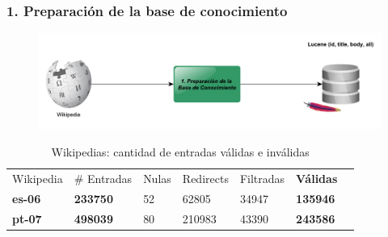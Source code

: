 \begin{frame}
\frametitle{1. Preparación de la base de conocimiento}
  \begin{figure}
      \includegraphics[scale=0.33]{graficos/pipeline-ibp}
  \end{figure}
    \begin{table}
    \centering
    \begin{center}
    \begin{tabular}{| l | l | l | l | l | l| l|}
    Wikipedia & \# Entradas & Nulas & Redirects & Filtradas & \textbf{Válidas} \\ 
    \textbf{es-06} & \textbf{233750} & 52 & 62805 & 34947 & \textbf{{\color{green}135946}} \\ 
    \textbf{pt-07} & \textbf{498039} & 80 & 210983 & 43390 & \textbf{{\color{green}243586}} \\ 
    \end{tabular}
    \caption{Wikipedias: cantidad de entradas válidas e inválidas}
    \label{table:creacion-indices}
    \end{center}
    \end{table}
\end{frame}



